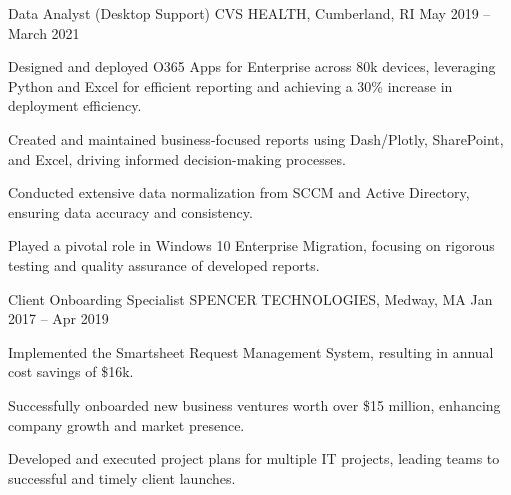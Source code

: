 \begin{cventries}

\cventry
{Data Analyst (Desktop Support)} %
{CVS HEALTH, Cumberland, RI} %
{} %
{May 2019 – March 2021} %
{ %
\begin{cvitems}
\item {Designed and deployed O365 Apps for Enterprise across 80k devices, leveraging Python and Excel for efficient reporting and achieving a 30\% increase in deployment efficiency.}
\item {Created and maintained business-focused reports using Dash/Plotly, SharePoint, and Excel, driving informed decision-making processes.}
\item {Conducted extensive data normalization from SCCM and Active Directory, ensuring data accuracy and consistency.}
\item {Played a pivotal role in Windows 10 Enterprise Migration, focusing on rigorous testing and quality assurance of developed reports.}
\end{cvitems}
}


\cventry
{Client Onboarding Specialist} %
{SPENCER TECHNOLOGIES, Medway, MA} %
{} %
{Jan 2017 – Apr 2019} %
{ %
\begin{cvitems}
\item {Implemented the Smartsheet Request Management System, resulting in annual cost savings of \$16k.}
\item {Successfully onboarded new business ventures worth over \$15 million, enhancing company growth and market presence.}
\item {Developed and executed project plans for multiple IT projects, leading teams to successful and timely client launches.}
\end{cvitems}
}


\end{cventries}
